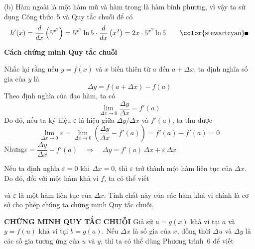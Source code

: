 \noindent
(b) Hàm ngoài là một hàm mũ và hàm trong là hàm bình phương, vì vậy ta sử dụng Công thức~5 và Quy tắc chuỗi để có
\[
h'(x) = \frac{d}{dx}\left(5^{x^2}\right) = 5^{x^2} \ln 5 \cdot \frac{d}{dx}\left(x^2\right) = 2x \cdot 5^{x^2} \ln 5 \tag*{\color{stewartcyan}\rule{1.1ex}{1.1ex}}
\]

\vspace{1.2em}
\noindent
{\color{stewartcyan}\raisebox{0.1ex}{\rule{1.1ex}{1.1ex}}}\hspace{0.5em}\textbf{\textsf{\large Cách chứng minh Quy tắc chuỗi}}

\vspace{0.6em}
\noindent
Nhắc lại rằng nếu $y = f(x)$ và $x$ biến thiên từ $a$ đến $a + \Delta x$, ta định nghĩa số gia của $y$ là
\[
\Delta y = f(a + \Delta x) - f(a)
\]
Theo định nghĩa của đạo hàm, ta có
\[
\lim_{\Delta x \to 0} \frac{\Delta y}{\Delta x} = f'(a)
\]
Do đó, nếu ta ký hiệu $\varepsilon$ là hiệu giữa $\Delta y/\Delta x$ và $f'(a)$, ta thu được
\[
\lim_{\Delta x \to 0} \varepsilon = \lim_{\Delta x \to 0} \left( \frac{\Delta y}{\Delta x} - f'(a) \right) = f'(a) - f'(a) = 0
\]
\noindent
Nhưng\hfill $\varepsilon = \dfrac{\Delta y}{\Delta x} - f'(a) \quad \Rightarrow \quad \Delta y = f'(a)\,\Delta x + \varepsilon\,\Delta x$\hfill\null

\vspace{0.6em}
\noindent
Nếu ta định nghĩa $\varepsilon = 0$ khi $\Delta x = 0$, thì $\varepsilon$ trở thành một hàm liên tục của $\Delta x$. Do đó, đối với một hàm khả vi $f$, ta có thể viết

\vspace{0.4em}
\noindent
{}
\vspace{0.4em}

\noindent
và $\varepsilon$ là một hàm liên tục của $\Delta x$. Tính chất này của các hàm khả vi chính là cơ sở cho phép chúng ta chứng minh Quy tắc chuỗi.

\vspace{1.2em}
\noindent
\textbf{\textsf{\color{stewartred}CHỨNG MINH QUY TẮC CHUỖI}}\quad
Giả sử $u = g(x)$ khả vi tại $a$ và $y = f(u)$ khả vi tại $b = g(a)$. Nếu $\Delta x$ là số gia của $x$, đồng thời $\Delta u$ và $\Delta y$ là các số gia tương ứng của $u$ và $y$, thì ta có thể dùng Phương trình~6 để viết

\vspace{0.4em}
\noindent
{}
\vspace{0.4em}

